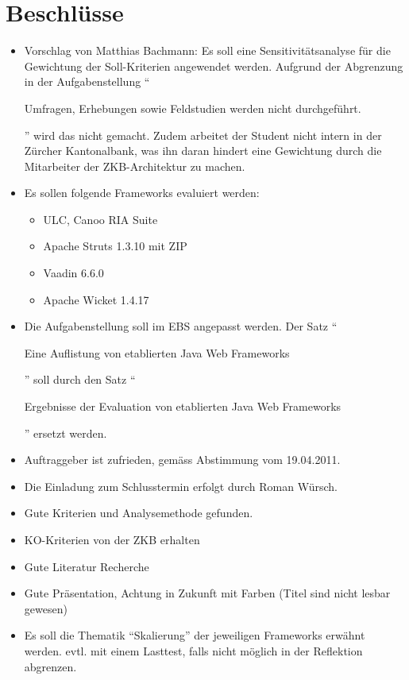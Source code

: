   \section{Beschlüsse}
  \begin{itemize}
      \item Vorschlag von Matthias Bachmann: Es soll eine Sensitivitätsanalyse
      für die Gewichtung der Soll-Kriterien angewendet werden. Aufgrund der
      Abgrenzung in der Aufgabenstellung ``\begin{itshape}Umfragen, Erhebungen
      sowie Feldstudien werden nicht durchgeführt.\end{itshape}'' wird das
      nicht gemacht. Zudem arbeitet der Student nicht intern in der Zürcher
      Kantonalbank, was ihn daran hindert eine Gewichtung durch die Mitarbeiter
      der ZKB-Architektur zu machen.
      \item Es sollen folgende Frameworks evaluiert werden:
      \begin{itemize}
        \item ULC, Canoo RIA Suite
        \item Apache Struts 1.3.10 mit ZIP
        \item Vaadin 6.6.0
        \item Apache Wicket 1.4.17
      \end{itemize}
      \item Die Aufgabenstellung soll im EBS angepasst werden. Der Satz
      ``\begin{itshape}Eine Auflistung von etablierten Java Web
      Frameworks\end{itshape}'' soll durch den Satz
      ``\begin{itshape}Ergebnisse der Evaluation von etablierten Java Web
      Frameworks\end{itshape}'' ersetzt werden.
      \item Auftraggeber ist zufrieden, gemäss Abstimmung vom 19.04.2011.
      \item Die Einladung zum Schlusstermin erfolgt durch Roman Würsch.
      \item Gute Kriterien und Analysemethode gefunden.
      \item KO-Kriterien von der ZKB erhalten
      \item Gute Literatur Recherche
      \item Gute Präsentation, Achtung in Zukunft mit Farben (Titel sind nicht
      lesbar gewesen)
      \item Es soll die Thematik ``Skalierung'' der jeweiligen Frameworks
      erwähnt werden. evtl. mit einem Lasttest, falls nicht möglich in der
      Reflektion abgrenzen.
  \end{itemize}